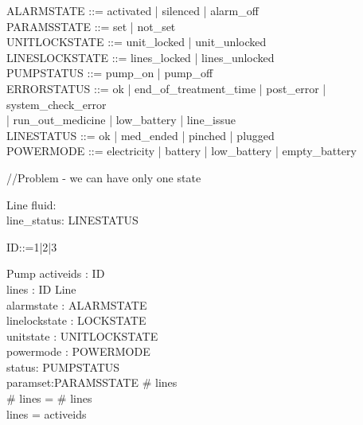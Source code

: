 \documentclass{article}
\begin{document}
	
	\begin{zed}
		
		ALARMSTATE ::= activated | silenced | alarm\_off \\
		
		PARAMSSTATE ::= set | not\_set \\
		
		UNITLOCKSTATE ::= unit\_locked | unit\_unlocked \\
		
		LINESLOCKSTATE ::= lines\_locked | lines\_unlocked \\
		
		PUMPSTATUS ::= pump\_on | pump\_off \\
		
		
		ERRORSTATUS ::= ok | end\_of\_treatment\_time | post\_error | system\_check\_error \\ | run\_out\_medicine | low\_battery | line_issue \\
		
		
		
		LINESTATUS ::= ok | med\_ended | pinched | plugged \\
		
		POWERMODE ::= electricity | battery | low\_battery | empty\_battery \\
	\end{zed}
	
	//Problem - we can have only one state
	
	\begin{schema}{Line}
		fluid: \nat \\
		line_status: LINESTATUS	
	\end{schema}
	
	\begin{zed}
		ID::=1|2|3
	\end{zed}
		
	\begin{schema}{Pump}
		activeids : \power ID\\
		lines : ID \pfun Line \\
		alarmstate : ALARMSTATE \\
		linelockstate : LOCKSTATE \\
		unitstate : UNITLOCKSTATE \\
		powermode : POWERMODE \\
		status: PUMPSTATUS\\
		paramset:PARAMSSTATE
	\where
		\# \ran lines \\
		\# \ran lines = \# \dom lines\\
		\dom lines = activeids\\
	\end{schema}
	
\end{document}
